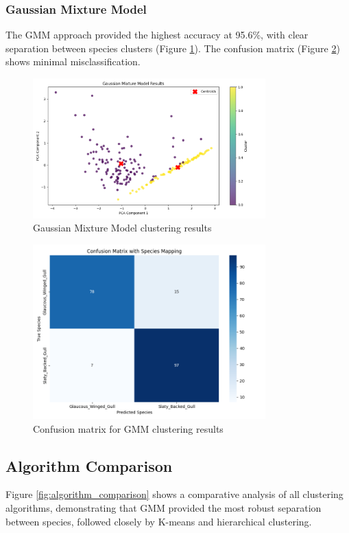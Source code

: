 \documentclass[a4paper,12pt]{report}
\begin{document}
\subsubsection{Gaussian Mixture Model}
The GMM approach provided the highest accuracy at 95.6\%, with clear separation between species clusters (Figure \ref{fig:gmm_clustering}). The confusion matrix (Figure \ref{fig:gmm_confusion_matrix}) shows minimal misclassification.

\begin{figure}[H]
    \centering
    \includegraphics[width=0.8\textwidth]{images/clustering/gmm_clustering.png}
    \caption{Gaussian Mixture Model clustering results}
    \label{fig:gmm_clustering}
\end{figure}

\begin{figure}[H]
    \centering
    \includegraphics[width=0.8\textwidth]{images/clustering/gmm_confusion_matrix.png}
    \caption{Confusion matrix for GMM clustering results}
    \label{fig:gmm_confusion_matrix}
\end{figure}

\subsection{Algorithm Comparison}
Figure \ref{fig:algorithm_comparison} shows a comparative analysis of all clustering algorithms, demonstrating that GMM provided the most robust separation between species, followed closely by K-means and hierarchical clustering.
\end{document}
